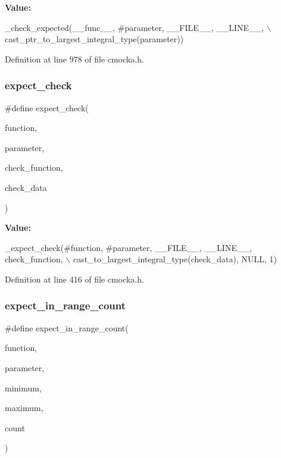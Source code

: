 {\bfseries Value\+:}
\begin{DoxyCode}
\_check\_expected(\_\_func\_\_, #parameter, \_\_FILE\_\_, \_\_LINE\_\_, \(\backslash\)
                    cast\_ptr\_to\_largest\_integral\_type(parameter))
\end{DoxyCode}


Definition at line 978 of file cmocka.\+h.

\mbox{\label{group__cmocka__param_ga32d73ef854fe7d833b39fa0e4cbc4313}} 
\subsubsection{\texorpdfstring{expect\+\_\+check}{expect\_check}}
{\footnotesize\ttfamily \#define expect\+\_\+check(\begin{DoxyParamCaption}\item[{}]{function,  }\item[{}]{parameter,  }\item[{}]{check\+\_\+function,  }\item[{}]{check\+\_\+data }\end{DoxyParamCaption})}

{\bfseries Value\+:}
\begin{DoxyCode}
\_expect\_check(#\textcolor{keyword}{function}, #parameter, \_\_FILE\_\_, \_\_LINE\_\_, check\_function, \(\backslash\)
                  cast\_to\_largest\_integral\_type(check\_data), NULL, 1)
\end{DoxyCode}


Definition at line 416 of file cmocka.\+h.

\mbox{\label{group__cmocka__param_ga0add5bf1bff3e2ccc98e1ad5de82691c}} 
\subsubsection{\texorpdfstring{expect\+\_\+in\+\_\+range\+\_\+count}{expect\_in\_range\_count}}
{\footnotesize\ttfamily \#define expect\+\_\+in\+\_\+range\+\_\+count(\begin{DoxyParamCaption}\item[{}]{function,  }\item[{}]{parameter,  }\item[{}]{minimum,  }\item[{}]{maximum,  }\item[{}]{count }\end{DoxyParamCaption})}

